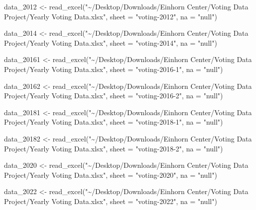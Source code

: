 \documentclass[
  letterpaper,
  DIV=11,
  numbers=noendperiod]{scrartcl}
\newenvironment{Shaded}{\begin{snugshade}}{\end{snugshade}}
\newcommand{\AttributeTok}[1]{\textcolor[rgb]{0.40,0.45,0.13}{#1}}
\newcommand{\FunctionTok}[1]{\textcolor[rgb]{0.28,0.35,0.67}{#1}}
\newcommand{\NormalTok}[1]{\textcolor[rgb]{0.00,0.23,0.31}{#1}}
\newcommand{\OtherTok}[1]{\textcolor[rgb]{0.00,0.23,0.31}{#1}}
\newcommand{\StringTok}[1]{\textcolor[rgb]{0.13,0.47,0.30}{#1}}
\begin{document}
\begin{Shaded}
\begin{Highlighting}[]
\NormalTok{data\_2012 }\OtherTok{\textless{}{-}} \FunctionTok{read\_excel}\NormalTok{(}\StringTok{"\textasciitilde{}/Desktop/Downloads/Einhorn Center/Voting Data Project/Yearly Voting Data.xlsx"}\NormalTok{, }
    \AttributeTok{sheet =} \StringTok{"voting{-}2012"}\NormalTok{, }\AttributeTok{na =} \StringTok{"null"}\NormalTok{)}

\NormalTok{data\_2014 }\OtherTok{\textless{}{-}} \FunctionTok{read\_excel}\NormalTok{(}\StringTok{"\textasciitilde{}/Desktop/Downloads/Einhorn Center/Voting Data Project/Yearly Voting Data.xlsx"}\NormalTok{, }
    \AttributeTok{sheet =} \StringTok{"voting{-}2014"}\NormalTok{, }\AttributeTok{na =} \StringTok{"null"}\NormalTok{)}

\NormalTok{data\_20161 }\OtherTok{\textless{}{-}} \FunctionTok{read\_excel}\NormalTok{(}\StringTok{"\textasciitilde{}/Desktop/Downloads/Einhorn Center/Voting Data Project/Yearly Voting Data.xlsx"}\NormalTok{, }
    \AttributeTok{sheet =} \StringTok{"voting{-}2016{-}1"}\NormalTok{, }\AttributeTok{na =} \StringTok{"null"}\NormalTok{)}

\NormalTok{data\_20162 }\OtherTok{\textless{}{-}} \FunctionTok{read\_excel}\NormalTok{(}\StringTok{"\textasciitilde{}/Desktop/Downloads/Einhorn Center/Voting Data Project/Yearly Voting Data.xlsx"}\NormalTok{, }
    \AttributeTok{sheet =} \StringTok{"voting{-}2016{-}2"}\NormalTok{, }\AttributeTok{na =} \StringTok{"null"}\NormalTok{)}

\NormalTok{data\_20181 }\OtherTok{\textless{}{-}} \FunctionTok{read\_excel}\NormalTok{(}\StringTok{"\textasciitilde{}/Desktop/Downloads/Einhorn Center/Voting Data Project/Yearly Voting Data.xlsx"}\NormalTok{, }
    \AttributeTok{sheet =} \StringTok{"voting{-}2018{-}1"}\NormalTok{, }\AttributeTok{na =} \StringTok{"null"}\NormalTok{)}

\NormalTok{data\_20182 }\OtherTok{\textless{}{-}} \FunctionTok{read\_excel}\NormalTok{(}\StringTok{"\textasciitilde{}/Desktop/Downloads/Einhorn Center/Voting Data Project/Yearly Voting Data.xlsx"}\NormalTok{, }
    \AttributeTok{sheet =} \StringTok{"voting{-}2018{-}2"}\NormalTok{, }\AttributeTok{na =} \StringTok{"null"}\NormalTok{)}

\NormalTok{data\_2020 }\OtherTok{\textless{}{-}} \FunctionTok{read\_excel}\NormalTok{(}\StringTok{"\textasciitilde{}/Desktop/Downloads/Einhorn Center/Voting Data Project/Yearly Voting Data.xlsx"}\NormalTok{, }
    \AttributeTok{sheet =} \StringTok{"voting{-}2020"}\NormalTok{, }\AttributeTok{na =} \StringTok{"null"}\NormalTok{)}

\NormalTok{data\_2022 }\OtherTok{\textless{}{-}} \FunctionTok{read\_excel}\NormalTok{(}\StringTok{"\textasciitilde{}/Desktop/Downloads/Einhorn Center/Voting Data Project/Yearly Voting Data.xlsx"}\NormalTok{, }
    \AttributeTok{sheet =} \StringTok{"voting{-}2022"}\NormalTok{, }\AttributeTok{na =} \StringTok{"null"}\NormalTok{)}
\end{Highlighting}
\end{Shaded}
\end{document}
